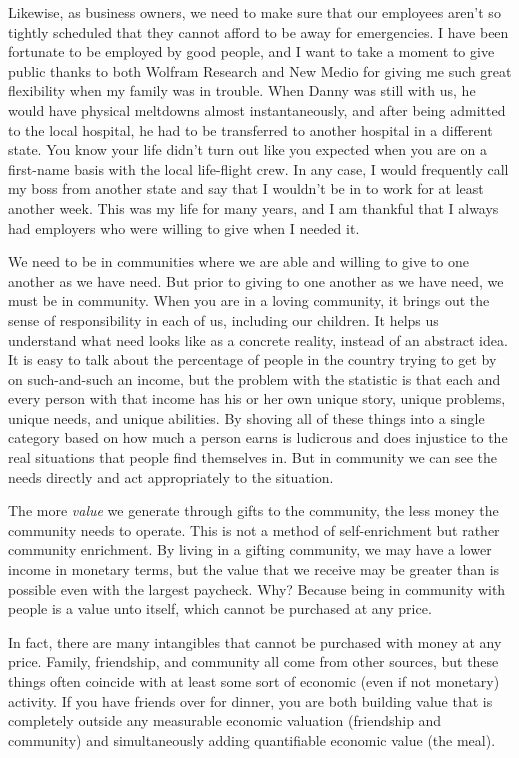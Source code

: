Likewise, as business owners, we need to make sure that our employees
aren’t so tightly scheduled that they cannot afford to be away for
emergencies. I have been fortunate to be employed by good people, and I
want to take a moment to give public thanks to both Wolfram Research
and New Medio for giving me such great flexibility when my family was
in trouble. When Danny was still with us, he would have physical
meltdowns almost instantaneously, and after being admitted to the local
hospital, he had to be transferred to another hospital in a different
state. You know your life didn’t turn out like you expected when you
are on a first-name basis with the local life-flight crew. In any case,
I would frequently call my boss from another state and say that I
wouldn’t be in to work for at least another week. This was my life for
many years, and I am thankful that I always had employers who were
willing to give when I needed it.

We need to be in communities where we are able and willing to give to
one another as we have need. But prior to giving to one another as we
have need, we must be in community. When you are in a loving community,
it brings out the sense of responsibility in each of us, including our
children. It helps us understand what need looks like as a concrete
reality, instead of an abstract idea. It is easy to talk about the
percentage of people in the country trying to get by on such-and-such
an income, but the problem with the statistic is that each and every
person with that income has his or her own unique story, unique
problems, unique needs, and unique abilities. By shoving all of these
things into a single category based on how much a person earns is
ludicrous and does injustice to the real situations that people find
themselves in. But in community we can see the needs directly and act
appropriately to the situation. 

The more \textit{value} we generate through gifts to the community, the
less money the community needs to operate. This is not a method of
self-enrichment but rather community enrichment. By living in a gifting
community, we may have a lower income in monetary terms, but the value
that we receive may be greater than is possible even with the largest
paycheck. Why?  Because being in community with people is a value unto
itself, which cannot be purchased at any price.

In fact, there are many intangibles that cannot be purchased with money
at any price. Family, friendship, and community all come from other
sources, but these things often coincide with at least some sort of
economic (even if not monetary) activity. If you have friends over for
dinner, you are both building value that is completely outside any
measurable economic valuation (friendship and community) and
simultaneously adding quantifiable economic value (the meal).

